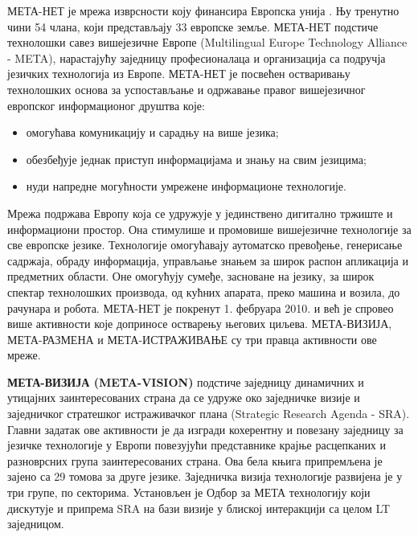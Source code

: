  \begin{multicols}{2}


МЕТА-НЕТ је мрежа изврсности коју финансира Европска унија \cite{rehm2011}. Њу тренутно чини 54 члана, који представљају 33 европске земље. МЕТА-НЕТ подстиче технолошки савез вишејезичне Европе (Multilingual Europe Technology Alliance - META), нарастајућу заједницу професионалаца и организација са подручја језичких технологија из Европе. 
МЕТА-НЕТ је посвећен остваривању технолошких основа за успостављање и одржавање правог вишејезичног европског информационог друштва које:
\begin{itemize}
\item омогућава комуникацију и сарадњу на више језика; 
\item обезбеђује једнак приступ информацијама и знању на свим језицима;
\item нуди напредне могућности умрежене информационе технологије.
\end{itemize}
Мрежа подржава Европу која се удружује у јединствено дигитално тржиште и информациони простор. Она стимулише и промовише вишејезичне технологије за све европске језике. Технологије омогућавају аутоматско превођење, генерисање садржаја, обраду информација, у\-прав\-ља\-ње знањем за широк распон апликација и предметних области. Оне омогућују сумеђе, засноване на језику, за широк спектар технолошких производа, од кућних апарата, преко машина и возила, до рачунара и робота. 
МЕТА-НЕТ је покренут 1. фебруара 2010. и већ је спровео више активности које доприносе остварењу његових циљева. МЕТА-ВИЗИЈА, МЕТА-РАЗМЕНА и МЕТА-ИСТРАЖИВАЊЕ су три правца активности ове мреже. 

\textbf{МЕТА-ВИЗИЈА (META-VISION)} подстиче заједницу динамичних и утицајних заинтересованих страна да се удруже око заједничке визије и заједничког стратешког истраживачког плана (Strategic Research Agenda - SRA). Главни задатак ове активности је да изгради кохерентну и повезану заједницу за језичке технологије у Европи повезујући представнике крајње расцепканих и разноврсних група заинтересованих страна. Ова бела књига припремљена је зајено са 29 томова за друге језике. Заједничка визија технологије развијена је у три групе, по секторима. Установљен је Одбор за МЕТА технологију који дискутује и припрема SRA на бази визије у блиској интеракцији са целом LT заједницом.    
   

\end{multicols}
